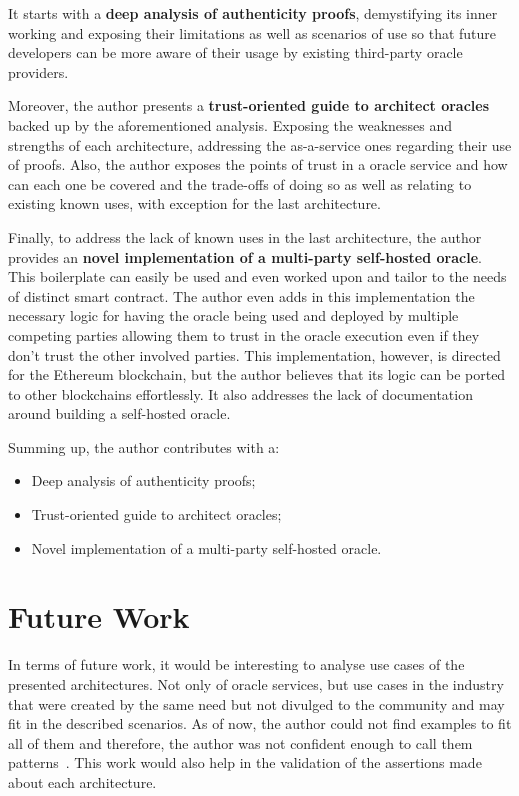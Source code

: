 It starts with a \textbf{deep analysis of authenticity proofs}, demystifying its inner working and exposing their limitations as well as scenarios of use so that future developers can be more aware of their usage by existing third-party oracle providers.

Moreover, the author presents a \textbf{trust-oriented guide to architect oracles} backed up by the aforementioned analysis. Exposing the weaknesses and strengths of each architecture, addressing the as-a-service ones regarding their use of proofs. Also, the author exposes the points of trust in a oracle service and how can each one be covered and the trade-offs of doing so as well as relating to existing known uses, with exception for the last architecture.

Finally, to address the lack of known uses in the last architecture, the author provides an \textbf{novel implementation of a multi-party self-hosted oracle}. This boilerplate can easily be used and even worked upon and tailor to the needs of distinct smart contract. The author even adds in this implementation the necessary logic for having the oracle being used and deployed by multiple competing parties allowing them to trust in the oracle execution even if they don't trust the other involved parties. This implementation, however, is directed for the Ethereum blockchain, but the author believes that its logic can be ported to other blockchains effortlessly. It also addresses the lack of documentation around building a self-hosted oracle.

\vspace{1cm}
Summing up, the author contributes with a:

\begin{itemize}
    \item Deep analysis of authenticity proofs;
    \item Trust-oriented guide to architect oracles;
    \item Novel implementation of a multi-party self-hosted oracle.
\end{itemize}

\section{Future Work}

In terms of future work, it would be interesting to analyse use cases of the presented architectures. Not only of oracle services, but use cases in the industry that were created by the same need but not divulged to the community and may fit in the described scenarios. As of now, the author could not find examples to fit all of them and therefore, the author was not confident enough to call them patterns~\citet{Alexander,Gamma1995}. This work would also help in the validation of the assertions made about each architecture.

